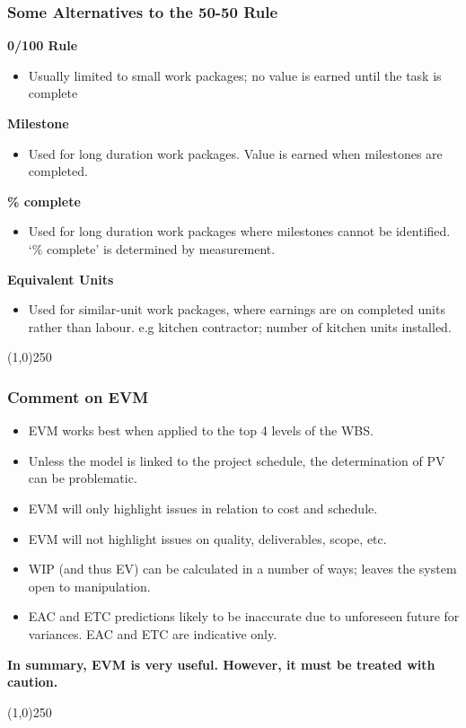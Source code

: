 \begin{frame}
\frametitle{Some Alternatives to the 50-50 Rule}
\textbf{0/100 Rule}
\begin{itemize}
	\item Usually limited to small work packages; no value is earned until the task is complete
\end{itemize}
\textbf{Milestone}
\begin{itemize}
	\item Used for long duration work packages.  Value is earned when milestones are completed.
\end{itemize}
\textbf{\% complete}
\begin{itemize}
	\item Used for long duration work packages where milestones cannot be identified.  ‘\% complete’ is determined by measurement.
\end{itemize}
\textbf{Equivalent Units}
\begin{itemize}
	\item Used for similar-unit work packages, where earnings are on completed units rather than labour.  e.g kitchen contractor; number of kitchen units installed.
\end{itemize}
\end{frame}
\begin{center}\line(1,0){250}\end{center}





\begin{frame}
\frametitle{Comment on EVM}
\begin{itemize}
	\item EVM works best when applied to the top 4 levels of the WBS.
	\item Unless the model is linked to the project schedule, the determination of PV can be problematic.
	\item EVM will only highlight issues in relation to cost and schedule.
	\item EVM will not highlight issues on quality, deliverables, scope, etc.
	\item WIP (and thus EV) can be calculated in a number of ways; leaves the system open to manipulation. 
	\item EAC and ETC predictions likely to be inaccurate due to unforeseen future for variances.  EAC and ETC are indicative only.
\end{itemize}
\textbf{In summary, EVM is very useful.  However, it must be treated with caution.}  
\end{frame}
\begin{center}\line(1,0){250}\end{center}




 